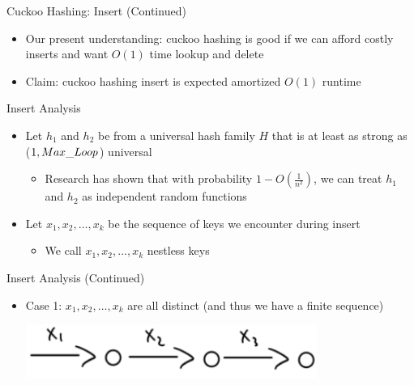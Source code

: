 \documentclass[aspectratio=169]{beamer}
\begin{document}
\begin{frame}{Cuckoo Hashing: Insert (Continued)}
    \begin{itemize}
        \item Our present understanding: cuckoo hashing is good if we can afford costly inserts and want $O(1)$ time lookup and delete \pause
        \item Claim: cuckoo hashing insert is expected amortized $O(1)$ runtime
    \end{itemize}
\end{frame}

\begin{frame}{Insert Analysis}
    \begin{itemize}
        \item Let $h_1$ and $h_2$ be from a universal hash family $H$ that is at least as strong as ($1, \emph{Max\_Loop}$) universal
        \begin{itemize}
            \item Research has shown that with probability $1 - O(\frac 1 {n^2})$, we can treat $h_1$ and $h_2$ as independent random functions
        \end{itemize} \pause
        \item Let $x_1, x_2, \ldots, x_k$ be the sequence of keys we encounter during insert
        \begin{itemize}
            \item We call $x_1, x_2, \ldots, x_k$ nestless keys
        \end{itemize}
    \end{itemize}
\end{frame}

\begin{frame}{Insert Analysis (Continued)}
    \begin{itemize}
        \item Case 1: $x_1, x_2, \ldots, x_k$ are all distinct (and thus we have a finite sequence)
        \begin{center}
            \includegraphics[width=0.75\textwidth]{images/case1.png}
        \end{center}
    \end{itemize}
\end{frame}
\end{document}
